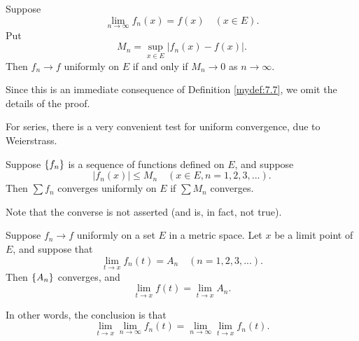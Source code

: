 \begin{thm}
    \label{thm:7.9}
    Suppose 
    \begin{equation*}
        \lim_{n \to \infty} f_n (x) = f(x)
        \quad 
        (x \in E).
    \end{equation*}
    Put 
    \begin{equation*}
        M_n = \sup_{x \in E} \left| f_n (x) - f(x) \right| .
    \end{equation*}
    Then $f_n \rightarrow f$ uniformly on $E$ if and only if $M_n \rightarrow 0$ as $n \rightarrow \infty$.
\end{thm}

Since this is an immediate consequence of Definition \ref{mydef:7.7}, 
we omit the details of the proof.

For series, there is a very convenient test for uniform convergence, due to
Weierstrass.

\begin{thm}
    \label{thm:7.10}
    Suppose $\protect\{f_n\}$ is a sequence of functions defined on $E$, 
    and suppose
    \begin{equation*}
        \left| f_n (x) \right| \leq M_n
        \quad 
        (x \in E, n = 1, 2, 3, ... ).
    \end{equation*}
    Then $\sum f_n$ converges uniformly on $E$ if $\sum M_n$ converges.
\end{thm}

Note that the converse is not asserted (and is, in fact, not true).

\begin{thm}
    \label{thm:7.11}
    Suppose $f_n \rightarrow f$ uniformly on a set $E$ in a metric space. 
    Let $x$ be a limit point of $E$, and suppose that
    \begin{equation}
        \label{eq:7.15}
        \lim_{t \to x} f_n (t) = A_n
        \quad
        (n = 1, 2, 3, ... ).
    \end{equation}
    Then $\protect\{A_n\}$ converges, and
    \begin{equation}
        \label{eq:7.16}
        \lim_{t \to x} f(t) = \lim_{t \to x} A_n.
    \end{equation}

    In other words, the conclusion is that
    \begin{equation}
        \label{eq:7.17}
        \lim_{t \to x} \lim_{n \to \infty} f_n (t) = 
        \lim_{n \to \infty} \lim_{t \to x} f_n (t).
    \end{equation}
\end{thm}

